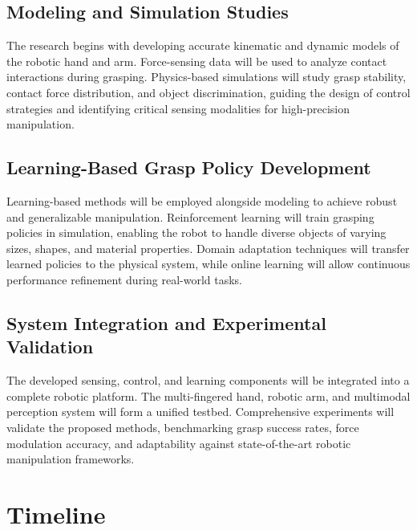 \documentclass[11pt,a4paper]{article}
\begin{document}
\subsection{Modeling and Simulation Studies}
The research begins with developing accurate kinematic and dynamic models of the robotic hand and arm. Force-sensing data will be used to analyze contact interactions during grasping. Physics-based simulations will study grasp stability, contact force distribution, and object discrimination, guiding the design of control strategies and identifying critical sensing modalities for high-precision manipulation.

\subsection{Learning-Based Grasp Policy Development}
Learning-based methods will be employed alongside modeling to achieve robust and generalizable manipulation. Reinforcement learning will train grasping policies in simulation, enabling the robot to handle diverse objects of varying sizes, shapes, and material properties. Domain adaptation techniques will transfer learned policies to the physical system, while online learning will allow continuous performance refinement during real-world tasks.

\subsection{System Integration and Experimental Validation}
The developed sensing, control, and learning components will be integrated into a complete robotic platform. The multi-fingered hand, robotic arm, and multimodal perception system will form a unified testbed. Comprehensive experiments will validate the proposed methods, benchmarking grasp success rates, force modulation accuracy, and adaptability against state-of-the-art robotic manipulation frameworks.

\section{Timeline}
\end{document}
